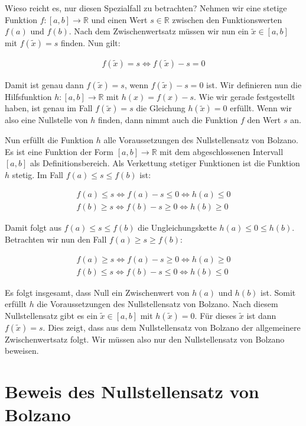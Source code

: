 \documentclass[fontsize=9pt,
               parskip=half-,
               DIV=14,
               listof=chapterentry,
               tocflat]{scrbook}
\begin{document}
Wieso reicht es, nur diesen Spezialfall zu betrachten? Nehmen wir eine stetige Funktion $f:[a,b]\to \mathbb {R} $ und einen Wert $s\in \mathbb {R} $ zwischen den Funktionswerten $f(a)$ und $f(b)$. Nach dem Zwischenwertsatz müssen wir nun ein ${\tilde {x}}\in [a,b]$ mit $f({\tilde {x}})=s$ finden. Nun gilt:

\begin{align*}
f({\tilde {x}})=s\iff f({\tilde {x}})-s=0
\end{align*}

Damit ist genau dann $f({\tilde {x}})=s$, wenn $f({\tilde {x}})-s=0$ ist. Wir definieren nun die Hilfsfunktion $h:[a,b]\to \mathbb {R} $ mit $h(x)=f(x)-s$. Wie wir gerade festgestellt haben, ist genau im Fall $f({\tilde {x}})=s$ die Gleichung $h({\tilde {x}})=0$ erfüllt. Wenn wir also eine Nullstelle von $h$ finden, dann nimmt auch die Funktion $f$ den Wert $s$ an.

Nun erfüllt die Funktion $h$ alle Voraussetzungen des Nullstellensatz von Bolzano. Es ist eine Funktion der Form $[a,b]\to \mathbb {R} $ mit dem abgeschlossenen Intervall $[a,b]$ als Definitionsbereich. Als Verkettung stetiger Funktionen ist die Funktion $h$ stetig. Im Fall $f(a)\leq s\leq f(b)$ ist:

\begin{align*}
f(a)\leq s\iff f(a)-s\leq 0\iff h(a)\leq 0\\[0.3em]f(b)\geq s\iff f(b)-s\geq 0\iff h(b)\geq 0
\end{align*}

Damit folgt aus $f(a)\leq s\leq f(b)$ die Ungleichungskette $h(a)\leq 0\leq h(b)$. Betrachten wir nun den Fall $f(a)\geq s\geq f(b)$:

\begin{align*}
f(a)\geq s\iff f(a)-s\geq 0\iff h(a)\geq 0\\[0.3em]f(b)\leq s\iff f(b)-s\leq 0\iff h(b)\leq 0
\end{align*}

Es folgt insgesamt, dass Null ein Zwischenwert von $h(a)$ und $h(b)$ ist. Somit erfüllt $h$ die Voraussetzungen des Nullstellensatz von Bolzano. Nach diesem Nullstellensatz gibt es ein ${\tilde {x}}\in [a,b]$ mit $h({\tilde {x}})=0$. Für dieses ${\tilde {x}}$ ist dann $f({\tilde {x}})=s$. Dies zeigt, dass aus dem Nullstellensatz von Bolzano der allgemeinere Zwischenwertsatz folgt. Wir müssen also nur den Nullstellensatz von Bolzano beweisen.

\section{Beweis des Nullstellensatz von Bolzano}
\end{document}
